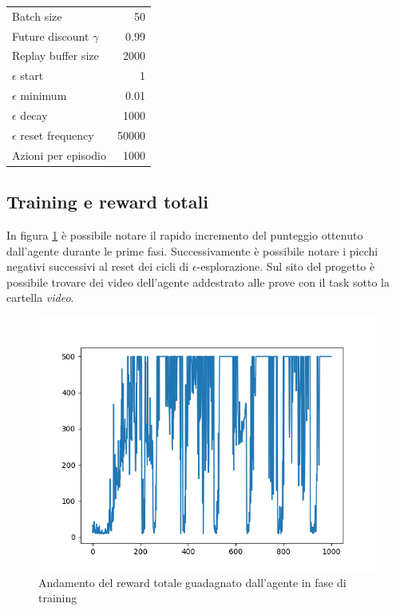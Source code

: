 \documentclass{article}
\begin{document}
		\begin{center}
		\begin{tabular}{l | r}
			Batch size & 50 \\
			Future discount $\gamma$ & 0.99 \\
			Replay buffer size & 2000 \\
			$\epsilon$ start & 1 \\
			$\epsilon$ minimum & 0.01 \\
			$\epsilon$ decay & 1000 \\
			$\epsilon$ reset frequency & 50000 \\
			Azioni per episodio & 1000 \\
		\end{tabular}
		\end{center}

	\subsection{Training e reward totali}
		In figura \ref{fig:rewards} è possibile notare il rapido incremento del punteggio ottenuto dall'agente durante le prime fasi. Successivamente è possibile notare i picchi negativi successivi al reset dei cicli di $\epsilon$-esplorazione. Sul sito del progetto \cite{git} è possibile trovare dei video dell'agente addestrato alle prove con il task sotto la cartella \textit{video}.

		\begin{figure}[H]
			\centering
			\includegraphics[width=0.8\linewidth]{rewards.png}
			\caption{Andamento del reward totale guadagnato dall'agente in fase di training}
			\label{fig:rewards}
		\end{figure}

	\newpage
	{}
	
\end{document}
